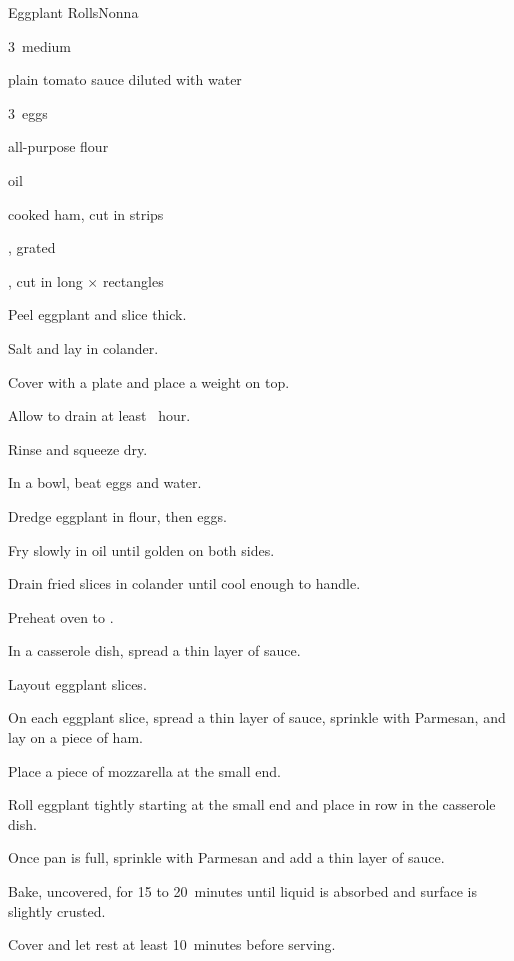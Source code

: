 \begin{recipe}{Eggplant Rolls}{Nonna}{}

\begin{ingredients}
\item 3~medium 
\item plain tomato sauce diluted with water
\item 3~eggs
\item all-purpose flour
\item oil
\item cooked ham, cut in  strips
\item {}, grated
\item {}, cut in long \inch{\quarter}$\times$\inch{\quarter} rectangles
\end{ingredients}

\begin{directions}
\item Peel eggplant and slice \inch{\quarter} thick.
\item Salt and lay in colander.
\item Cover with a plate and place a weight on top.
\item Allow to drain at least \half{}~hour.
\item Rinse and squeeze dry.
\item In a bowl, beat eggs and \C{\half} water.
\item Dredge eggplant in flour, then eggs.
\item Fry slowly in  oil until golden on both sides.
\item Drain fried slices in colander until cool enough to handle.
\item Preheat oven to .
\item In a casserole dish, spread a thin layer of sauce.
\item Layout eggplant slices.
\item On each eggplant slice, spread a thin layer of sauce, sprinkle with Parmesan, and lay on a piece of ham.
\item Place a piece of mozzarella at the small end.
\item Roll eggplant tightly starting at the small end and place in row in the casserole dish.
\item Once pan is full, sprinkle with Parmesan and add a thin layer of sauce.
\item Bake, uncovered, for 15 to 20~minutes until liquid is absorbed and surface is slightly crusted.
\item Cover and let rest at least 10~minutes before serving.
\end{directions}

\end{recipe}
